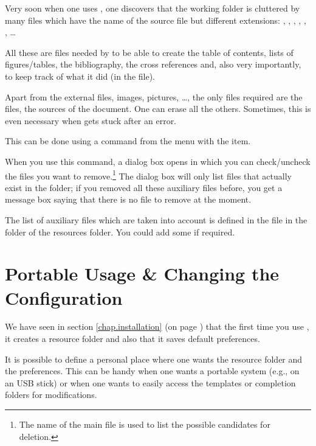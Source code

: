 Very soon when one uses {\AllTeX}, one discovers that the working folder is cluttered by many files which have the name of the source file but different extensions: , , , , , , \dots

All these are files needed by {\AllTeX} to be able to create the table of contents, lists of figures/tables, the bibliography, the cross references and, also very importantly, to keep track of what it did (in the  file).

Apart from the external files, images, pictures, \dots, the only files required are the  files, the sources of the document. One can erase all the others. Sometimes, this is even necessary when {\AllTeX} gets stuck after an error.

This can be done using a {\Tw} command from the  menu with the \submenu{} item.

When you use this command, a dialog box opens in which you can check/uncheck the files you want to remove.\footnote{The name of the main file is used to list the possible candidates for deletion.} The dialog box will only list files that actually exist in the folder; if you removed all these auxiliary files before, you get a message box saying that there is no file to remove at the moment.

The list of auxiliary files which are taken into account is defined in the file  in the  folder of the {\Tw} resources folder. You could add some if required.

\section{Portable Usage \& Changing the Configuration}
\label{sec.portable_configuration}

We have seen in section \ref{chap.installation} (on page \pageref{chap.installation}) that the first time you use {\Tw}, it creates a resource folder and also that it saves default preferences.

It is possible to define a personal place where one wants the resource folder and the preferences. This can be handy when one wants a portable system (e.g., on an USB stick) or when one wants to easily access the templates or completion folders for modifications.

